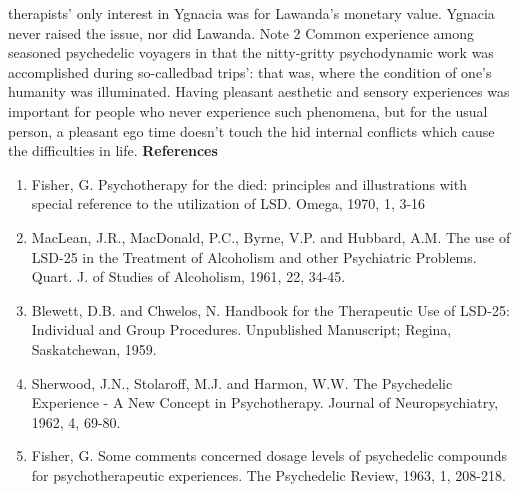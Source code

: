 \documentclass[12pt]{book}
\begin{document}
therapists' only interest in Ygnacia was for Lawanda's monetary value. Ygnacia never raised the issue, nor did Lawanda. Note 2 Common experience among seasoned psychedelic voyagers in that the nitty-gritty psychodynamic work was accomplished during so-calledbad trips': that was, where the condition of one's humanity was illuminated. Having pleasant aesthetic and sensory experiences was important for people who never experience such phenomena, but for the usual person, a pleasant ego time doesn't touch the hid internal conflicts which cause the difficulties in life. \textbf{References} \begin{enumerate} \item Fisher, G. Psychotherapy for the died: principles and illustrations with special reference to the utilization of LSD. Omega, 1970, 1, 3-16 \item MacLean, J.R., MacDonald, P.C., Byrne, V.P. and Hubbard, A.M. The use of LSD-25 in the Treatment of Alcoholism and other Psychiatric Problems. Quart. J. of Studies of Alcoholism, 1961, 22, 34-45. \item Blewett, D.B. and Chwelos, N. Handbook for the Therapeutic Use of LSD-25: Individual and Group Procedures. Unpublished Manuscript; Regina, Saskatchewan, 1959. \item Sherwood, J.N., Stolaroff, M.J. and Harmon, W.W. The Psychedelic Experience - A New Concept in Psychotherapy. Journal of Neuropsychiatry, 1962, 4, 69-80. \item Fisher, G. Some comments concerned dosage levels of psychedelic compounds for psychotherapeutic experiences. The Psychedelic Review, 1963, 1, 208-218. \end{enumerate}
\end{document}
